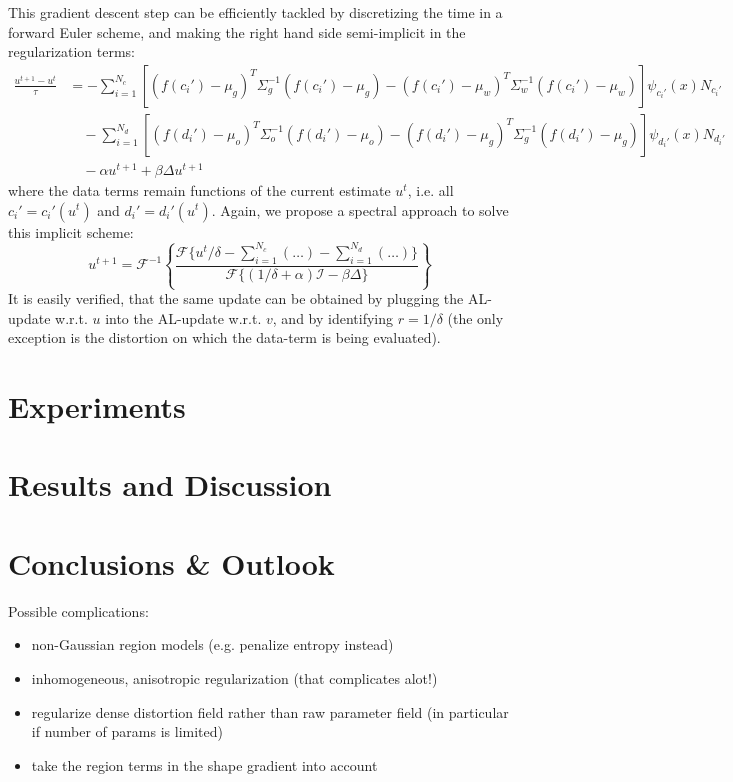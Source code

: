 \documentclass[a4paper,12pt]{article}
\begin{document}
This gradient descent step can be efficiently tackled by discretizing the time in a forward Euler scheme, and making the right hand side semi-implicit in the regularization terms:
\begin{align}
\frac{u^{t+1}-u^t}{\tau} &= - \sum_{i=1}^{N_c} \left[(f(c_i')-\mu_g)^T\Sigma_g^{-1}(f(c_i')-\mu_g) - (f(c_i')-\mu_w)^T\Sigma_w^{-1}(f(c_i')-\mu_w)\right]\psi_{c_i'}(x)N_{c_i'}\nonumber\\
&\quad -\sum_{i=1}^{N_d} \left[(f(d_i')-\mu_o)^T\Sigma_o^{-1}(f(d_i')-\mu_o) - (f(d_i')-\mu_g)^T\Sigma_g^{-1}(f(d_i')-\mu_g)\right]\psi_{d_i'}(x)N_{d_i'}\nonumber\\
&\quad -\alpha u^{t+1} + \beta\Delta u^{t+1}
\end{align}
where the data terms remain functions of the current estimate $u^t$, i.e. all $c_i' = c_i'(u^t)$ and $d_i' = d_i'(u^t)$. Again, we propose a spectral approach to solve this implicit scheme:
\begin{equation}
u^{t+1} = \mathcal{F}^{-1}\left\{ \frac{\mathcal{F}\{u^t/\delta - \sum_{i=1}^{N_c}(\ldots) - \sum_{i=1}^{N_d}(\ldots)  \}}{\mathcal{F}\{(1/\delta+\alpha)\mathcal{I}-\beta\Delta\}} \right\}
\end{equation}
It is easily verified, that the same update can be obtained by plugging the AL-update w.r.t. $u$ into the AL-update w.r.t. $v$, and by identifying $r = 1/\delta$ (the only exception is the distortion on which the data-term is being evaluated).

\section{Experiments}
\section{Results and Discussion}
\section{Conclusions \& Outlook}
Possible complications:
\begin{itemize}
\item non-Gaussian region models (e.g. penalize entropy instead)
\item inhomogeneous, anisotropic regularization (that complicates alot!)
\item regularize dense distortion field rather than raw parameter field (in particular if number of params is limited)
\item take the region terms in the shape gradient into account
\end{itemize}



\end{document}
